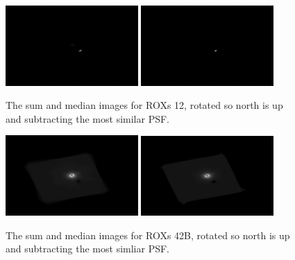 \documentclass[12pt]{article}
\begin{document}
\begin{figure}[H]
\centering
\includegraphics[width=0.45\textwidth]{sum_rot_psf_12.png}
\includegraphics[width=0.45\textwidth]{med_rot_psf_12.png}
\vspace{-1em}
\caption{The sum and median images for ROXs 12, rotated so north is up and subtracting the most similar PSF.}
\end{figure}
\vspace{-1.2em}
\begin{figure}[H]
\centering
\includegraphics[width=0.45\textwidth]{sum_rot_psf_42b.png}
\includegraphics[width=0.45\textwidth]{med_rot_psf_42b.png}
\vspace{-1em}
\caption{The sum and median images for ROXs 42B, rotated so north is up and subtracting the most simliar PSF.}
\end{figure}
\end{document}

